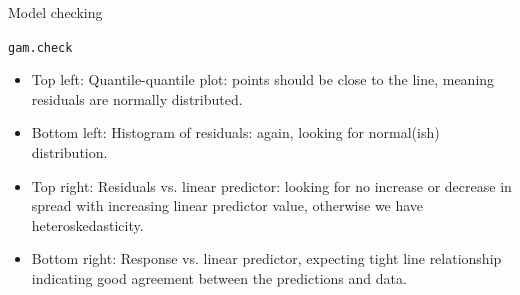 
\begin{block}{Model checking}
  \begin{subblock}{\texttt{gam.check}}
      \includegraphics[width=\textwidth]{gamcheck.pdf}
    \begin{itemize}
      \item Top left: Quantile-quantile plot: points should be close to the line, meaning residuals are normally distributed.
      \item Bottom left: Histogram of residuals: again, looking for normal(ish) distribution.
      \item Top right: Residuals vs. linear predictor: looking for no increase or decrease in spread with increasing linear predictor value, otherwise we have heteroskedasticity.
      \item Bottom right: Response vs. linear predictor, expecting tight line relationship indicating good agreement between the predictions and data.
    \end{itemize}
  \end{subblock}
\end{block}
